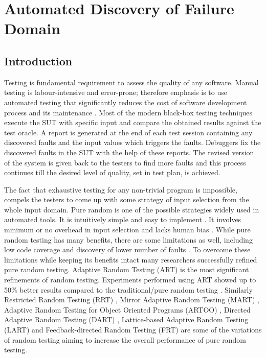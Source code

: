 \chapter{Automated Discovery of Failure Domain}
\label{chap:ADFD}

\section{Introduction}\label{sec:intro5}
Testing is fundamental requirement to assess the quality of any software. Manual testing is labour-intensive and error-prone; therefore emphasis is to use automated testing that significantly reduces the cost of software development process and its maintenance \cite{beizer1995black}. Most of the modern black-box testing techniques execute the SUT with specific input and compare the obtained results against the test oracle. A report is generated at the end of each test session containing any discovered faults and the input values which triggers the faults. Debuggers fix the discovered faults in the SUT with the help of these reports. The revised version of the system is given back to the testers to find more faults and this process continues till the desired level of quality, set in test plan, is achieved.

The fact that exhaustive testing for any non-trivial program is impossible, compels the testers to come up with some strategy of input selection from the whole input domain. Pure random is one of the possible strategies widely used in automated tools. It is intuitively simple and easy to implement \cite{Ciupa2008, Forrester2000}. It involves minimum or no overhead in input selection and lacks human bias \cite{hamlet1994, Linger1993}. While pure random testing has many benefits, there are some limitations as well, including low code coverage \cite{Offutt1996} and discovery of lower number of faults \cite{Chen1994}. To overcome these limitations while keeping its benefits intact many researchers successfully refined pure random testing. Adaptive Random Testing (ART) is the most significant refinements of random testing. Experiments performed using ART showed up to 50\% better results compared to the traditional/pure random testing  \cite{Chen2008}.  Similarly Restricted Random Testing (RRT) \cite{Chan2002}, Mirror Adaptive Random Testing (MART)  \cite{Chen2004}, Adaptive Random Testing for Object Oriented Programs (ARTOO) \cite{Ciupa2008}, Directed Adaptive Random Testing (DART)  \cite{Godefroid2005}, Lattice-based Adaptive Random Testing (LART) \cite{Mayer2005} and Feedback-directed Random Testing (FRT) \cite{Pacheco2007} are some of the variations of random testing aiming to increase the overall performance of pure random testing.

